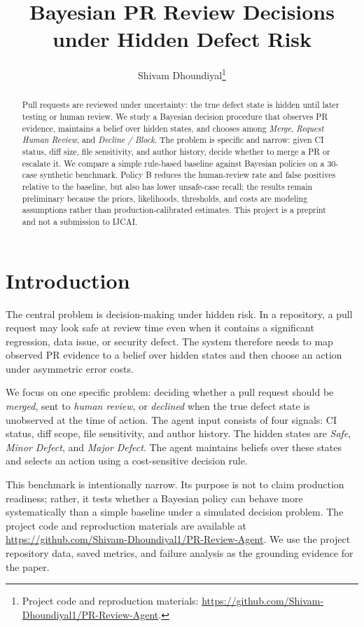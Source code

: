\documentclass{article}
\title{Bayesian PR Review Decisions under Hidden Defect Risk}
\author{
Shivam Dhoundiyal\thanks{Project code and reproduction materials: \url{https://github.com/Shivam-Dhoundiyal1/PR-Review-Agent}.}
}
\begin{document}
\maketitle

\begin{abstract}
Pull requests are reviewed under uncertainty: the true defect state is hidden until later testing or human review. We study a Bayesian decision procedure that observes PR evidence, maintains a belief over hidden states, and chooses among \emph{Merge}, \emph{Request Human Review}, and \emph{Decline / Block}. The problem is specific and narrow: given CI status, diff size, file sensitivity, and author history, decide whether to merge a PR or escalate it. We compare a simple rule-based baseline against Bayesian policies on a 30-case synthetic benchmark. Policy B reduces the human-review rate and false positives relative to the baseline, but also has lower unsafe-case recall; the results remain preliminary because the priors, likelihoods, thresholds, and costs are modeling assumptions rather than production-calibrated estimates. This project is a preprint and not a submission to IJCAI.
\end{abstract}

\section{Introduction}

The central problem is decision-making under hidden risk. In a repository, a pull request may look safe at review time even when it contains a significant regression, data issue, or security defect. The system therefore needs to map observed PR evidence to a belief over hidden states and then choose an action under asymmetric error costs.

We focus on one specific problem: deciding whether a pull request should be \emph{merged}, sent to \emph{human review}, or \emph{declined} when the true defect state is unobserved at the time of action. The agent input consists of four signals: CI status, diff scope, file sensitivity, and author history. The hidden states are \emph{Safe}, \emph{Minor Defect}, and \emph{Major Defect}. The agent maintains beliefs over these states and selects an action using a cost-sensitive decision rule.

This benchmark is intentionally narrow. Its purpose is not to claim production readiness; rather, it tests whether a Bayesian policy can behave more systematically than a simple baseline under a simulated decision problem. The project code and reproduction materials are available at \url{https://github.com/Shivam-Dhoundiyal1/PR-Review-Agent}. We use the project repository data, saved metrics, and failure analysis as the grounding evidence for the paper.
\end{document}
